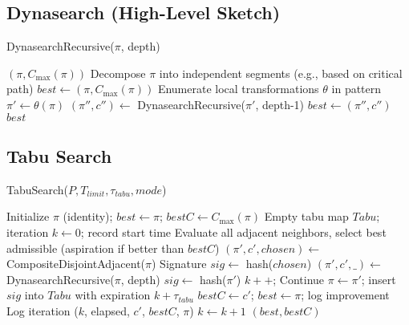 \subsection{Dynasearch (High-Level Sketch)}
\begin{algorithm}[h]
  \caption{DynasearchRecursive($\pi$, depth)}
  \begin{algorithmic}[1]
     \Return $(\pi, C_{\max}(\pi))$ \EndIf
    \State Decompose $\pi$ into independent segments (e.g., based on critical path)
    \State $best \gets (\pi, C_{\max}(\pi))$
      \State Enumerate local transformations $\theta$ in pattern
        \State $\pi' \gets \theta(\pi)$
        \State $(\pi'', c'') \gets$ DynasearchRecursive($\pi'$, depth-1)
         $best \gets (\pi'', c'')$ \EndIf
      \EndFor
    \EndFor
    \State \Return $best$
  \end{algorithmic}
\end{algorithm}

\subsection{Tabu Search}
\begin{algorithm}[h]
  \caption{TabuSearch($P, T_{limit}, \tau_{tabu}, mode$)}
  \begin{algorithmic}[1]
    \State Initialize $\pi$ (identity); $best \gets \pi$; $bestC \gets C_{\max}(\pi)$
    \State Empty tabu map $Tabu$; iteration $k \gets 0$; record start time
        \State Evaluate all adjacent neighbors, select best admissible (aspiration if better than $bestC$)
        \State $(\pi', c', chosen) \gets$ CompositeDisjointAdjacent($\pi$)
        \State Signature $sig \gets$ hash($chosen$)
        \State $(\pi', c', \_) \gets$ DynasearchRecursive($\pi$, depth)
        \State $sig \gets$ hash($\pi'$)
      \EndIf
       $k{+}{+}$; Continue \EndIf
      \State $\pi \gets \pi'$; insert $sig$ into $Tabu$ with expiration $k + \tau_{tabu}$
       $bestC \gets c'$; $best \gets \pi$; log improvement \EndIf
      \State Log iteration ($k$, elapsed, $c'$, $bestC$, $\pi$)
      \State $k \gets k+1$
    \EndWhile
    \State \Return $(best, bestC)$
  \end{algorithmic}
\end{algorithm}

